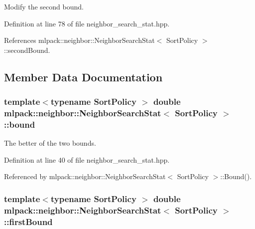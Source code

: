 Modify the second bound. 



Definition at line 78 of file neighbor\-\_\-search\-\_\-stat.\-hpp.



References mlpack\-::neighbor\-::\-Neighbor\-Search\-Stat$<$ Sort\-Policy $>$\-::second\-Bound.



\subsection{Member Data Documentation}
\subsubsection[{bound}]{\setlength{\rightskip}{0pt plus 5cm}template$<$typename Sort\-Policy $>$ double {\bf mlpack\-::neighbor\-::\-Neighbor\-Search\-Stat}$<$ Sort\-Policy $>$\-::bound\hspace{0.3cm}{\ttfamily [private]}}\label{classmlpack_1_1neighbor_1_1NeighborSearchStat_a873c5cc684f027d851b08939f1f30631}


The better of the two bounds. 



Definition at line 40 of file neighbor\-\_\-search\-\_\-stat.\-hpp.



Referenced by mlpack\-::neighbor\-::\-Neighbor\-Search\-Stat$<$ Sort\-Policy $>$\-::\-Bound().

\subsubsection[{first\-Bound}]{\setlength{\rightskip}{0pt plus 5cm}template$<$typename Sort\-Policy $>$ double {\bf mlpack\-::neighbor\-::\-Neighbor\-Search\-Stat}$<$ Sort\-Policy $>$\-::first\-Bound\hspace{0.3cm}{\ttfamily [private]}}\label{classmlpack_1_1neighbor_1_1NeighborSearchStat_ab555ed384690f47d9cbef7697c27b05c}


